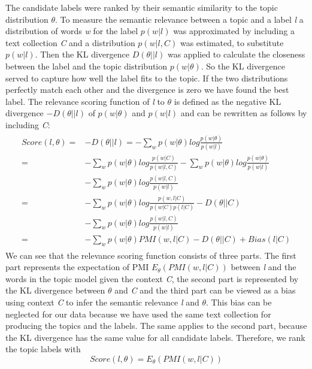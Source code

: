 The candidate labels were ranked by their semantic similarity to the topic distribution $\theta$. To measure the semantic relevance between a topic and a label \textit{l} a distribution of words \textit{w} for the label $p(w|l)$ was approximated by including a text collection \textit{C} and a distribution $p(w|l,C)$ was estimated, to substitute $p(w|l)$. Then the \acf{KL} divergence $D(\theta||l)$ was applied to calculate the closeness between the label and the topic distribution $p(w|\theta)$. So the \ac{KL} divergence served to capture how well the label fits to the topic. If the two distributions perfectly match each other and the divergence is zero we have found the best label. 
The relevance scoring function of \textit{l}  to $\theta$ is defined as the negative \ac{KL} divergence $-D(\theta||l)$ of $p(w|\theta)$ and $p(w|l)$ and can be rewritten as follows by including \textit{C}:
\begin{align}
\begin{split}
	Score(l,\theta) = &-D(\theta||l) =
	-\sum_{w} p(w|\theta)log\frac{p(w|\theta)}{p(w|l)}\\ =
	&-\sum_{w} p(w|\theta)log\frac{p(w|C)}{p(w|l,C)} -\sum_{w} p(w|\theta)log\frac{p(w|\theta)}{p(w|l)}\\ &-\sum_{w} p(w|\theta)log\frac{p(w|l,C)}{p(w|l)} \\ =
	&-\sum_{w} p(w|\theta)log\frac{p(w,l|C)}{p(w|C) p(l|C)} -D(\theta||C)\\ &-\sum_{w} p(w|\theta)log\frac{p(w|l,C)}{p(w|l)}\\  =
	&-\sum_{w} p(w|\theta) PMI(w,l|C)-D(\theta||C) + Bias(l|C) 
\end{split}
\end{align}
We can see that the relevance scoring function consists of three parts. The first part represents the expectation of \ac{PMI} $E_{\theta}(PMI(w,l|C))$ between \textit{l} and the words in the topic model given the context \textit{C}, the second part is represented by the \ac{KL} divergence between $\theta$ and \textit{C} and the third part can be viewed as a bias using context
\textit{C} to infer the semantic relevance \textit{l} and $\theta$. This bias can be neglected for our data because we have used the same text collection for  producing the topics and the labels. The same applies to the second part, because the \ac{KL} divergence has the same value for all candidate labels. Therefore, we rank the topic labels with 
\begin{equation}
Score(l,\theta) = E_{\theta}(PMI(w,l|C))
\label{Mei:Scoring}
\end{equation}

